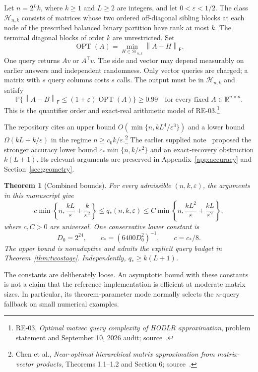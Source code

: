 \documentclass[11pt]{article}
\newtheorem{theorem}{Theorem}[section]
\theoremstyle{remark}
\newcommand{\R}{\mathbb R}
\newcommand{\Prob}{\mathbb P}
\newcommand{\F}{\mathsf F}
\newcommand{\Hclass}{\mathcal H_{n,k}}
\newcommand{\OPT}{\operatorname{OPT}}
\newcommand{\eps}{\varepsilon}
\newcommand{\norm}[1]{\left\lVert #1\right\rVert}
\begin{document}
Let $n=2^Lk$, where $k\ge1$ and $L\ge2$ are integers, and let
$0<\eps<1/2$. The class $\Hclass$ consists of matrices whose two ordered
off-diagonal sibling blocks at each node of the prescribed balanced binary
partition have rank at most $k$. The terminal diagonal blocks of order $k$
are unrestricted. Set
\[
 \OPT(A)=\min_{H\in\Hclass}\norm{A-H}_{\F}.
\]
One query returns $Av$ or $A^{\mathsf T}v$. The side and vector may depend
measurably on earlier answers and independent randomness. Only vector queries
are charged; a matrix with $s$ query columns costs $s$ calls. The output must
be in $\Hclass$ and satisfy
\begin{equation}\label{eq:guarantee}
 \Prob\{\norm{A-B}_{\F}\le(1+\eps)\OPT(A)\}\ge0.99
 \quad\text{for every fixed }A\in\R^{n\times n}.
\end{equation}
This is the quantifier order and exact-real arithmetic model of RE-03.\footnote{
RE-03, \emph{Optimal matvec query complexity of HODLR approximation}, problem
statement and September 10, 2026 audit; source~\cite{re03}.}

The repository cites an upper bound $O(\min\{n,kL^4/\eps^3\})$ and a lower
bound $\Omega(kL+k/\eps)$ in the regime $n\ge c_0k/\eps$.\footnote{
Chen et al., \emph{Near-optimal hierarchical matrix approximation from
matrix-vector products}, Theorems 1.1--1.2 and Section 6; source~\cite{chen}.}
The earlier supplied note~\cite{prior} proposed the stronger accuracy lower
bound $c_*\min\{n,k/\eps^2\}$ and an exact-recovery obstruction $k(L+1)$.
Its relevant arguments are preserved in Appendix~\ref{app:accuracy} and
Section~\ref{sec:geometry}.

\begin{theorem}[Combined bounds]\label{thm:combined}
For every admissible $(n,k,\eps)$, the arguments in this manuscript give
\begin{equation}\label{eq:combined}
 c\min\left\{n,\frac{kL}{\eps}+\frac{k}{\eps^2}\right\}
 \le q_*(n,k,\eps)
 \le C\min\left\{n,\frac{kL^2}{\eps}+\frac{kL}{\eps^2}\right\},
\end{equation}
where $c,C>0$ are universal. One conservative lower constant is
\[
 D_0=2^{24},\qquad c_*=(6400D_0^2)^{-1},\qquad c=c_*/8.
\]
The upper bound is nonadaptive and admits the explicit query budget in
Theorem~\ref{thm:twostage}. Independently, $q_*\ge k(L+1)$.
\end{theorem}

The constants are deliberately loose. An asymptotic bound with these constants
is not a claim that the reference implementation is efficient at moderate
matrix sizes. In particular, its theorem-parameter mode normally selects the
$n$-query fallback on small numerical examples.
\end{document}
